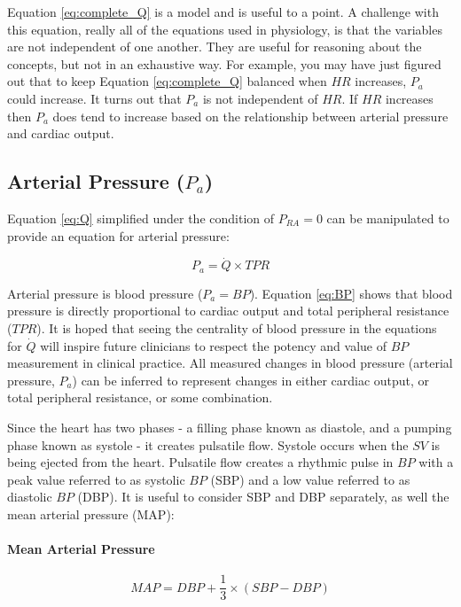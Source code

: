 Equation \ref{eq:complete_Q} is a model and is useful to a point. A challenge with this equation, really all of the equations used in physiology, is that the variables are not independent of one another. They are useful for reasoning about the concepts, but not in an exhaustive way. For example, you may have just figured out that to keep Equation \ref{eq:complete_Q} balanced when $HR$ increases, $P_a$ could increase. It turns out that $P_a$ is not independent of $HR$. If $HR$ increases then $P_a$ does tend to increase based on the relationship between arterial pressure and cardiac output.

\subsection{Arterial Pressure ($P_{a}$)}

Equation \ref{eq:Q} simplified under the condition of $P_{RA} = 0$ can be manipulated to provide an equation for arterial pressure:

\begin{equation}
    P_{a} = \dot{Q} \times TPR
    \label{eq:BP}
\end{equation}

Arterial pressure is blood pressure ($P_a = BP$). Equation \ref{eq:BP} shows that blood pressure is directly proportional to cardiac output and total peripheral resistance ($TPR$). It is hoped that seeing the centrality of blood pressure in the equations for $\dot{Q}$ will inspire future clinicians to respect the potency and value of $BP$ measurement in clinical practice. All measured changes in blood pressure (arterial pressure, $P_a$) can be inferred to represent changes in either cardiac output, or total peripheral resistance, or some combination.

Since the heart has two phases - a filling phase known as diastole, and a pumping phase known as systole - it creates pulsatile flow. Systole occurs when the $SV$ is being ejected from the heart. Pulsatile flow creates a rhythmic pulse in $BP$ with a peak value referred to as systolic $BP$ (SBP) and a low value referred to as diastolic $BP$ (DBP). It is useful to consider SBP and DBP separately, as well the mean arterial pressure (MAP):

\paragraph{Mean Arterial Pressure}

\begin{equation}
    MAP = DBP + \frac{1}{3} \times (SBP - DBP)
    \label{eq:MAP}
\end{equation}


